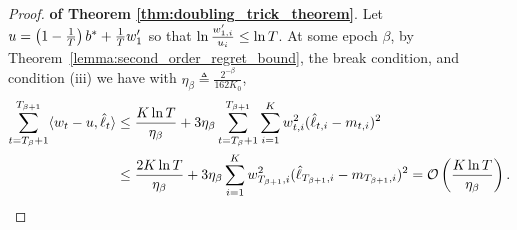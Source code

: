 \begin{proof}{\textbf{of Theorem \ref{thm:doubling_trick_theorem}}.}
Let $u=\left(1-\frac{1}{T}\right)b^*+\frac{1}{T}w_1^\prime$ so that $\ln \frac{w^\prime_{1,i}}{u_i} \leq \ln T$.
At some epoch $\beta$, by Theorem~\ref{lemma:second_order_regret_bound}, the break condition, and condition (iii) we have with $\eta_\beta\triangleq\frac{2^{-\beta}}{162K_0}$,
\begin{align*}
\sum_{t= T_\beta+1}^{T_{\beta+1}}\langle {w_t-u, \hat{\ell}_t} \rangle &\leq \frac{K\ln T}{\eta_\beta} + 
3\eta_\beta\sum_{t=T_\beta+1}^{T_{\beta+1}}\sum_{i=1}^K w_{t,i}^2(\hat{\ell}_{t,i}-m_{t,i})^2 \\
& \leq  \frac{2K\ln T}{\eta_\beta} + 3\eta_\beta \sum_{i=1}^K w_{T_{\beta+1},i}^2(\hat{\ell}_{T_{\beta+1},i}-m_{T_{\beta+1},i})^2 
= \mathcal{O}\left(\frac{K\ln T}{\eta_\beta}\right).
\end{align*}


\end{proof}
